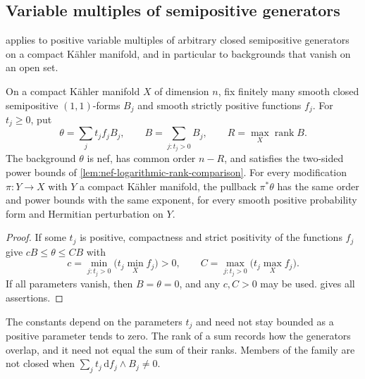 \subsection{Variable multiples of semipositive generators}
\label{sec:nef-maximum-rank-comparison}

 applies to positive variable multiples of arbitrary closed semipositive generators on a compact K\"ahler manifold, and in particular to backgrounds that vanish on an open set.

\begin{corollary}\label{cor:nef-variable-semipositive-generators}
On a compact K\"ahler manifold $X$ of dimension $n$, fix finitely many smooth closed semipositive $(1,1)$-forms $B_j$ and smooth strictly positive functions $f_j$. For $t_j\geq0$, put
\[
 \theta=\sum_jt_jf_jB_j,\qquad
 B=\sum_{j:t_j>0}B_j,\qquad R=\max_X\operatorname{rank}B.
\]
The background $\theta$ is nef, has common order $n-R$, and satisfies the two-sided power bounds of \cref{lem:nef-logarithmic-rank-comparison}. For every modification $\pi\colon Y\to X$ with $Y$ a compact K\"ahler manifold, the pullback $\pi^*\theta$ has the same order and power bounds with the same exponent, for every smooth positive probability form and Hermitian perturbation on $Y$.
\end{corollary}
\begin{proof}
If some $t_j$ is positive, compactness and strict positivity of the functions $f_j$ give $cB\leq\theta\leq CB$ with
\[
 c=\min_{j:t_j>0}\bigl(t_j\min_X f_j\bigr)>0,\qquad
 C=\max_{j:t_j>0}\bigl(t_j\max_X f_j\bigr).
\]
If all parameters vanish, then $B=\theta=0$, and any $c,C>0$ may be used.  gives all assertions.
\end{proof}

The constants depend on the parameters $t_j$ and need not stay bounded as a positive parameter tends to zero. The rank of a sum records how the generators overlap, and it need not equal the sum of their ranks. Members of the family are not closed when $\sum_jt_j\,\mathrm df_j\wedge B_j\ne0$.


